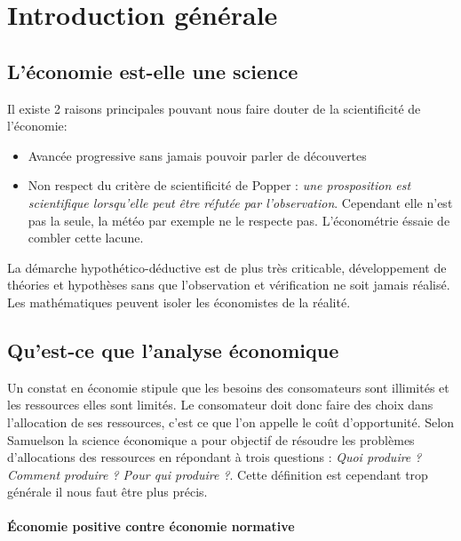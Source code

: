 \section{Introduction générale} %
\label{prt:introduction_generale}

\subsection{L'économie est-elle une science} %
\label{sec:l_economie_est_elle_une_science}
Il existe 2 raisons principales pouvant nous faire douter de la scientificité de l'économie:

\begin{itemize}[label=]
	\item Avancée progressive sans jamais pouvoir parler de découvertes	
	\item Non respect du critère de scientificité de Popper : \emph{une prosposition est scientifique lorsqu'elle peut être réfutée par l'observation}. Cependant elle n'est pas la seule, la météo par exemple ne le respecte pas. L'économétrie éssaie de combler cette lacune.
\end{itemize}

La démarche hypothético-déductive est de plus très criticable, développement de théories et hypothèses sans que l'observation et vérification ne soit jamais réalisé. Les mathématiques peuvent isoler les économistes de la réalité.


\subsection{Qu'est-ce que l'analyse économique} %
\label{sec:qu_est_ce_que_l_analyse_economique}

Un constat en économie stipule que les besoins des consomateurs sont illimités et les ressources elles sont limités. Le consomateur doit donc faire des choix dans l'allocation de ses ressources, c'est ce que l'on appelle le coût d'opportunité. Selon Samuelson la science économique a pour objectif de résoudre les problèmes d'allocations des ressources en répondant à trois questions : \emph{Quoi produire ? Comment produire ? Pour qui produire ?}. Cette définition est cependant trop générale il nous faut être plus précis. 

\paragraph{Économie positive contre économie normative} %
\label{par:economie_positive_contre_economie_normative}

